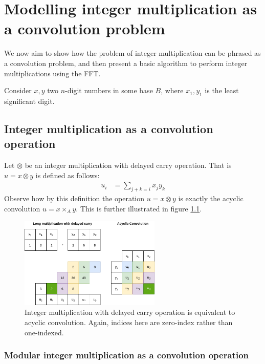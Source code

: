 \chapter{Modelling integer multiplication as a convolution problem}
\label{chapter:integer_multiplication_convolution}

We now aim to show how the problem of integer multiplication can be phrased as
a convolution problem, and then present a basic algorithm to perform integer
multiplications using the FFT.

Consider $x, y$ two $n$-digit numbers in some base $B$, where $x_1, y_1$ is the
least significant digit.

\section{Integer multiplication as a convolution operation}

Let $\otimes$ be an integer multiplication with delayed carry operation. That
is $u = x \otimes y$ is defined as follows:
\begin{align*}
		u_i & = \sum_{j + k = i} x_j y_k
\end{align*}
Observe how by this definition the operation $u = x \otimes y$ is exactly the
acyclic convolution $u = x \times_A y$. This is further illustrated in figure
\ref{fig:multiplication_convolution}.

\begin{figure}
		\centering
		\includegraphics[width=0.6\textwidth]{../resources/multiplication_convolution.drawio.png}
		\caption{
				Integer multiplication with delayed carry operation is
				equivalent to acyclic convolution. Again, indices here are
				zero-index rather than one-indexed.
		}
		\label{fig:multiplication_convolution}
\end{figure}

\subsection{Modular integer multiplication as a convolution operation}
\label{sec:modular_integer_multiplication_convolution}

